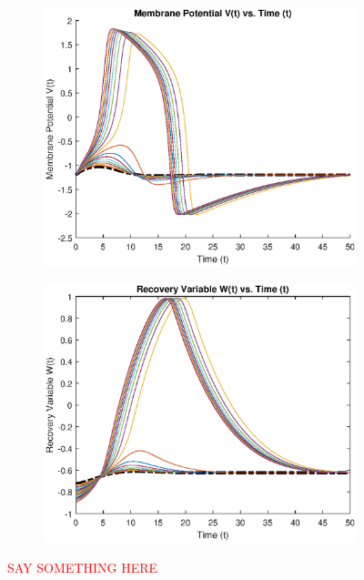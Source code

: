 \documentclass{book}
\theoremstyle{definition}
\begin{document}
\begin{figure}[!htb]
	\centering
	\begin{subfigure}{0.5\textwidth}
		\centering
		\includegraphics[scale=0.6]{FHN_lab/V_t_4.eps}
	\end{subfigure}%
	\begin{subfigure}{0.5\textwidth}
		\centering
		\includegraphics[scale=0.6]{FHN_lab/W_t_4.eps}
		
	\end{subfigure}%
	\caption{\textcolor{red}{SAY SOMETHING HERE}}
	\label{Fig:6}
\end{figure}
\end{document}
